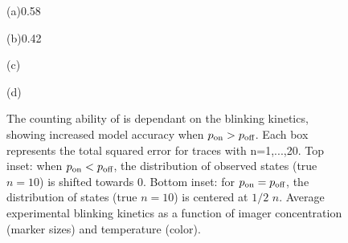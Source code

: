 \begin{figure}

  \begin{panel}{(a)}{0.58\textwidth}
    \vspace{-2mm}%
    \small%
    \setlength\plotwidth{42mm}%
    \setlength\plotheight{60mm}%
    
  \end{panel}
  \begin{panel}{(b)}{0.42\textwidth}
    \vspace{-2mm}%
    \setlength\plotwidth{56mm}%
    \setlength\plotheight{60mm}%
    
  \end{panel}

  \begin{panel}{(c)}{\textwidth}
    \small%
    \setlength\plotwidth{\textwidth}%
    \setlength\plotheight{36mm}%
    \vspace{-4mm}%
  \end{panel}

  \begin{panel}{(d)}{\textwidth}
    \small%
    \setlength\plotwidth{\textwidth}%
    \setlength\plotheight{36mm}%
    
  \end{panel}

  \caption{%
     The counting ability of \ours is dependant on the blinking kinetics, 
      showing increased model accuracy when $p_\text{on} > p_\text{off}$. Each box represents the total squared 
      error for traces with n=1,...,20.
      Top inset: when $p_\text{on} < p_\text{off}$, the distribution of
      observed \z{} states (true $n=10$) is shifted towards 0. Bottom inset: for
      $p_\text{on} = p_\text{off}$, the distribution of \z{} states (true $n=10$) is centered at $1/2$ $n$.
     Average experimental blinking kinetics as a function of imager
      concentration (marker sizes) and temperature (color).
    \captbc
  }
\end{figure}
\begin{figure}
  \label{fig:results:campare_kinetics}
\end{figure}
